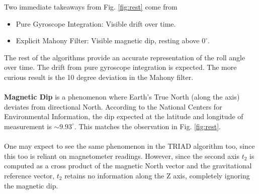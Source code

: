 \documentclass{article}
\begin{document}
Two immediate takeaways from Fig. \ref{fig:rest} come from

\begin{itemize}
    \item Pure Gyroscope Integration: Visible drift over time.
    \item Explicit Mahony Filter: Visible magnetic dip, resting above $0^\circ$. 
\end{itemize}

The rest of the algorithms provide an accurate representation of the roll angle over time. The drift from pure gyroscope integration is expected. The more curious result is the 10 degree deviation in the Mahony filter.\\
\\
\textbf{Magnetic Dip} is a phenomenon where Earth's True North (along the axis) deviates from directional North. According to the National Centers for Environmental Information, the dip expected at the latitude and longitude of measurement is $\sim 9.93 ^\circ$. This matches the observation in Fig. \ref{fig:rest}.\\
\\
One may expect to see the same phenomenon in the TRIAD algorithm too, since this too is reliant on magnetometer readings. However, since the second axis $t_2$ is computed as a cross product of the magnetic North vector and the gravitational reference vector, $t_2$ retains no information along the Z axis, completely ignoring the magnetic dip.
\end{document}
